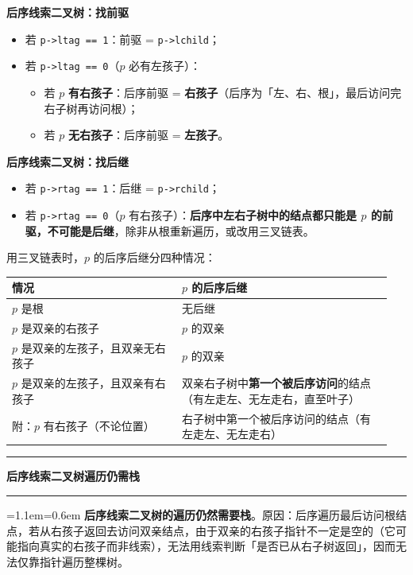 \documentclass[11pt,openany,UTF8]{ctexbook}
\newcommand{\callouthead}[2]{%
  \par\addvspace{7pt}\noindent
  {\color{#1}\rule[-0.15em]{3pt}{1.05em}}\hspace{0.5em}%
  {\bfseries\color{#1}#2}\par\nobreak\vspace{-0.35em}%
  {\color{rulesep}\hrule height 0.4pt}\nobreak\vspace{0.45em}%
  \begingroup\small\setlength{\parindent}{0pt}%
  \leftskip=1.1em\rightskip=0.6em\noindent\ignorespaces}
\newcommand{\calloutend}{\par\endgroup\addvspace{7pt}}
\newenvironment{callwarn}[1]{\callouthead{warnbar}{#1}}{\calloutend}
\begin{document}
\textbf{后序线索二叉树：找前驱}

\begin{itemize}
\item 若 \texttt{p->\allowbreak{}ltag =\allowbreak{}=\allowbreak{} 1}：前驱 = \texttt{p->\allowbreak{}lchild}；
\item 若 \texttt{p->\allowbreak{}ltag =\allowbreak{}=\allowbreak{} 0}（$p$ 必有左孩子）：
\begin{itemize}
\item 若 $p$ \textbf{有右孩子}：后序前驱 = \textbf{右孩子}（后序为「左、右、根」，最后访问完右子树再访问根）；
\item 若 $p$ \textbf{无右孩子}：后序前驱 = \textbf{左孩子}。
\end{itemize}
\end{itemize}
\textbf{后序线索二叉树：找后继}

\begin{itemize}
\item 若 \texttt{p->\allowbreak{}rtag =\allowbreak{}=\allowbreak{} 1}：后继 = \texttt{p->\allowbreak{}rchild}；
\item 若 \texttt{p->\allowbreak{}rtag =\allowbreak{}=\allowbreak{} 0}（$p$ 有右孩子）：\textbf{后序中左右子树中的结点都只能是 $p$ 的前驱，不可能是后继}，除非从根重新遍历，或改用三叉链表。
\end{itemize}
用三叉链表时，$p$ 的后序后继分四种情况：

\begingroup\small\setlength{\tabcolsep}{4.0pt}
\begin{longtable}{@{}L{0.4257\linewidth}L{0.5200\linewidth}@{}}
\toprule
\textbf{情况} & \textbf{$p$ 的后序后继} \\
\midrule
\endhead
$p$ 是根 & 无后继 \\
$p$ 是双亲的右孩子 & $p$ 的双亲 \\
$p$ 是双亲的左孩子，且双亲无右孩子 & $p$ 的双亲 \\
$p$ 是双亲的左孩子，且双亲有右孩子 & 双亲右子树中\textbf{第一个被后序访问}的结点（有左走左、无左走右，直至叶子） \\
附：$p$ 有右孩子（不论位置） & 右子树中第一个被后序访问的结点（有左走左、无左走右） \\
\bottomrule
\end{longtable}
\endgroup

\begin{callwarn}{后序线索二叉树遍历仍需栈}
\textbf{后序线索二叉树的遍历仍然需要栈}。原因：后序遍历最后访问根结点，若从右孩子返回去访问双亲结点，由于双亲的右孩子指针不一定是空的（它可能指向真实的右孩子而非线索），无法用线索判断「是否已从右子树返回」，因而无法仅靠指针遍历整棵树。

\end{callwarn}
\end{document}
